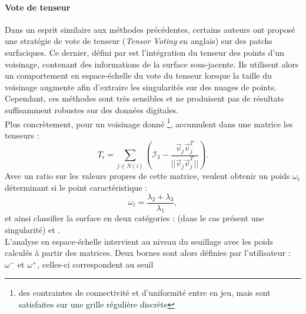 %
%
\paragraph{Vote de tenseur}
%
%
Dans un esprit similaire aux méthodes précédentes, certains auteurs
\cite{Park2012} ont proposé une stratégie de vote de tenseur (\emph{Tensor
Voting} en anglais) sur des patchs surfaciques. Ce dernier, défini par
 est l'intégration du tenseur des points d'un
voisinage, contenant des informations de la surface sous-jacente. Ils utilisent
alors un comportement en espace-échelle du vote du tenseur lorsque la taille du
voisinage augmente afin d'extraire les singularités sur des nuages de points.
Cependant, ces méthodes sont très sensibles et ne produisent pas de résultats
suffisamment robustes sur des données digitales.
%
\\
%
Plus concrètement, pour un voisinage donné \footnote{des contraintes de
connectivité et d'uniformité entre en jeu, mais sont satisfaites sur une grille
régulière discrète},  accumulent dans une matrice les
tenseurs :
%
\begin{equation}
  T_i = \sum\limits_{j \in N(i)} \left(\mathcal{I}_3 - \frac{\overrightarrow{v}_j\overrightarrow{v}_j^T}{||\overrightarrow{v}_j\overrightarrow{v}_j^T||} \right) .
\end{equation}
%
%
Avec un ratio sur les valeurs propres de cette matrice,  veulent
obtenir un poids $\omega_i$ déterminant si le point caractéristique :
%
\begin{equation}
  \omega_i = \frac{\lambda_2 + \lambda_3}{\lambda_1},
\end{equation}
%
et ainsi classifier la surface en deux catégories : \Feature (\cad dans le cas
présent une singularité) et \NonFeature.
%
\\
%
L'analyse en espace-échelle intervient au niveau du seuillage avec les poids
calculés à partir des matrices. Deux bornes sont alors définies par
l'utilisateur : $\omega^-$ et $\omega^+$, celles-ci correspondent au seuil
